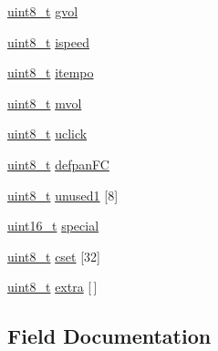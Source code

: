 \begin{DoxyCompactItemize}
\hyperlink{inttypes_8h_aba7bc1797add20fe3efdf37ced1182c5}{uint8\+\_\+t} \hyperlink{struct____attribute_____a8f5a65f2f782e8c40bd85b24ad8a829e}{gvol}
\item 
\hyperlink{inttypes_8h_aba7bc1797add20fe3efdf37ced1182c5}{uint8\+\_\+t} \hyperlink{struct____attribute_____aef12e1a68453baadbac20ebf0eb0c3d0}{ispeed}
\item 
\hyperlink{inttypes_8h_aba7bc1797add20fe3efdf37ced1182c5}{uint8\+\_\+t} \hyperlink{struct____attribute_____a5df0a9f230bfdac49902e03bc0f1e77d}{itempo}
\item 
\hyperlink{inttypes_8h_aba7bc1797add20fe3efdf37ced1182c5}{uint8\+\_\+t} \hyperlink{struct____attribute_____a3db00fa3f62a120e00e33075c2f8306e}{mvol}
\item 
\hyperlink{inttypes_8h_aba7bc1797add20fe3efdf37ced1182c5}{uint8\+\_\+t} \hyperlink{struct____attribute_____a615d8deee60857f787edbe5a4f9b8663}{uclick}
\item 
\hyperlink{inttypes_8h_aba7bc1797add20fe3efdf37ced1182c5}{uint8\+\_\+t} \hyperlink{struct____attribute_____a1c96e8575bb17c4a4ea756ead622725a}{defpan\+FC}
\item 
\hyperlink{inttypes_8h_aba7bc1797add20fe3efdf37ced1182c5}{uint8\+\_\+t} \hyperlink{struct____attribute_____a219da68c9162d77e0f6253829ef341b5}{unused1} \mbox{[}8\mbox{]}
\item 
\hyperlink{inttypes_8h_a273cf69d639a59973b6019625df33e30}{uint16\+\_\+t} \hyperlink{struct____attribute_____a51cc43dbd58b5eb5e42bdf3b08ead180}{special}
\item 
\hyperlink{inttypes_8h_aba7bc1797add20fe3efdf37ced1182c5}{uint8\+\_\+t} \hyperlink{struct____attribute_____a63bf4e88a763ffd0c79290e91a157234}{cset} \mbox{[}32\mbox{]}
\item 
\hyperlink{inttypes_8h_aba7bc1797add20fe3efdf37ced1182c5}{uint8\+\_\+t} \hyperlink{struct____attribute_____a968577f1acf7a5f34796dffd33830003}{extra} \mbox{[}$\,$\mbox{]}
\end{DoxyCompactItemize}


\subsection{Field Documentation}
\mbox{\label{struct____attribute_____a63bf4e88a763ffd0c79290e91a157234}} 
